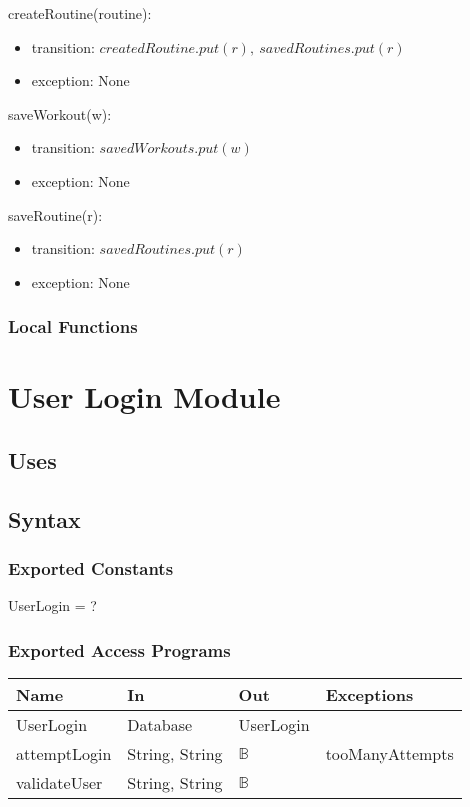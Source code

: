 \documentclass[12pt, titlepage]{article}
\begin{document}
createRoutine(routine):
\begin{itemize}
	\item transition: $ createdRoutine.put(r), \ savedRoutines.put(r) $
	\item exception: None
\end{itemize}

saveWorkout(w):
\begin{itemize}
	\item transition: $ savedWorkouts.put(w) $
	\item exception: None
\end{itemize}

saveRoutine(r):
\begin{itemize}
	\item transition: $ savedRoutines.put(r) $
	\item exception: None
\end{itemize}

\subsubsection{Local Functions}

\newpage

\section{User Login Module}

\subsection{Uses}

\subsection{Syntax}

\subsubsection{Exported Constants}
UserLogin = ?
\subsubsection{Exported Access Programs}

\begin{center}
	\begin{tabular}{p{2cm} p{4cm} p{4cm} p{2cm}}
		\hline
		\textbf{Name} & \textbf{In} & \textbf{Out} & \textbf{Exceptions} \\
		\hline
		UserLogin & Database & UserLogin &  \\
		attemptLogin & String, String & $\mathbb{B}$ & tooManyAttempts \\
		validateUser & String, String & $\mathbb{B}$ &  \\
		\hline
	\end{tabular}
\end{center}
\end{document}
